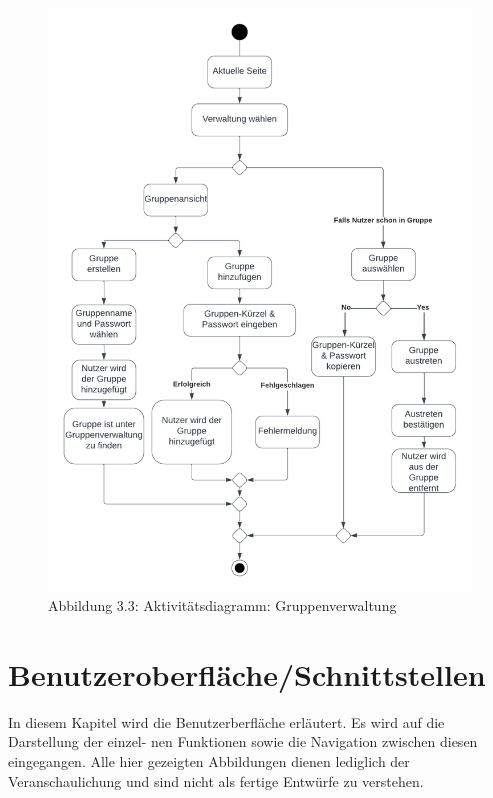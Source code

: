 \documentclass[parskip=full]{scrartcl}
\begin{document}
\begin{figure}[!htp]
    \centering
    \includegraphics{images/section3/ActivityDiagramGroupSettings.png}\\
    Abbildung 3.3: Aktivitätsdiagramm: Gruppenverwaltung
    \label{fig:A33}
\end{figure}
\newpage

\section{Benutzeroberfläche/Schnittstellen}
\renewcommand{\thesubsection}{$\langle$UI\arabic{subsection}$\rangle$}

In diesem Kapitel wird die Benutzerberfläche erläutert. Es wird auf die Darstellung der einzel- nen Funktionen sowie die Navigation zwischen diesen eingegangen. Alle hier gezeigten Abbildungen dienen lediglich der Veranschaulichung und sind nicht als fertige Entwürfe zu verstehen.
\end{document}
